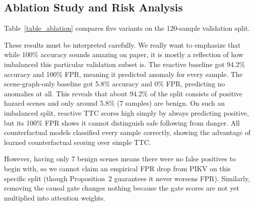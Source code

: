 \documentclass[preprint,12pt]{elsarticle}
\begin{document}
\subsection{Ablation Study and Risk Analysis}
Table~\ref{table_ablation} compares five variants on the 120-sample validation split.

\begin{table}[H]
\caption{Ablation study on the 120-sample validation split (anomaly threshold CRT $> 0.4$).}
\centering
\label{table_ablation}
\end{table}

These results must be interpreted carefully. We really want to emphasize that while 100\% accuracy sounds amazing on paper, it is mostly a reflection of how imbalanced this particular validation subset is. The reactive baseline got 94.2\% accuracy and 100\% FPR, meaning it predicted anomaly for every sample. The scene-graph-only baseline got 5.8\% accuracy and 0\% FPR, predicting no anomalies at all. This reveals that about 94.2\% of the split consists of positive hazard scenes and only around 5.8\% (7 samples) are benign. On such an imbalanced split, reactive TTC scores high simply by always predicting positive, but its 100\% FPR shows it cannot distinguish safe following from danger. All counterfactual models classified every sample correctly, showing the advantage of learned counterfactual scoring over simple TTC.

However, having only 7 benign scenes means there were no false positives to begin with, so we cannot claim an empirical FPR drop from PIKV on this specific split (though Proposition~2 guarantees it never worsens FPR). Similarly, removing the causal gate changes nothing because the gate scores are not yet multiplied into attention weights.
\end{document}
